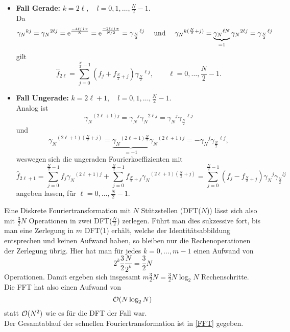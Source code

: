 \begin{itemize}

\item \textbf{Fall Gerade:} $k=2\ell, \quad l=0,1,\ldots,\frac{N}{2}-1$. \\
Da
\begin{displaymath}
{\gamma_N}^{kj} = {\gamma_N}^{2\ell j} = {\operatorname{e}}^{\frac{-4\ell j\operatorname{i}\pi}{N}} = {\operatorname{e}}^{\frac{-2\ell j\operatorname{i}\pi}{N/2}} = {\gamma_\frac{N}{2}}^{\ell j}
\quad\text{ und }\quad
{\gamma_N}^{k(\frac{N}{2}+j)} = \underbrace{{\gamma_N}^{\ell N}}_{=1} {\gamma_N}^{2\ell j} = {\gamma_\frac{N}{2}}^{\ell j}
\end{displaymath}
gilt
\begin{displaymath}
\hat{f}_{2\ell} =  \sum^{\frac{N}{2}-1}_{j=0} (f_j+f_{\frac{N}{2}+j}){\gamma_{\frac{N}{2}}}^{\ell j}, \qquad \ell=0,\ldots,\frac{N}{2}-1.
\end{displaymath}

\item \textbf{Fall Ungerade:} $k=2\ell+1, \quad l=0,1,\ldots,\frac{N}{2}-1$. \\
Analog ist
\begin{displaymath}
{\gamma_N}^{(2\ell+1)j} = {\gamma_N}^{j}{\gamma_N}^{2\ell j} = {\gamma_N}^{j}{\gamma_\frac{N}{2}}^{\ell j}
\end{displaymath}
und
\begin{displaymath}
{\gamma_N}^{(2\ell+1)(\frac{N}{2}+j)} = \underbrace{{\gamma_N}^{(2\ell+1)\frac{N}{2}}}_{=-1} {\gamma_N}^{(2\ell+1)j}   = -{\gamma_N}^{j}{\gamma_\frac{N}{2}}^{\ell j},
\end{displaymath}
weswegen sich die ungeraden Fourierkoeffizienten mit
\begin{displaymath}
\hat{f}_{2\ell+1} =  \sum^{\frac{N}{2}-1}_{j=0} f_j {\gamma_N}^{(2\ell+1)j} + \sum^{\frac{N}{2}-1}_{j=0} f_{\frac{N}{2}+j} {\gamma_N}^{(2\ell+1)(\frac{N}{2}+j)} =  \sum^{\frac{N}{2}-1}_{j=0} (f_j - f_{\frac{N}{2}+j}  ) {\gamma_N}^j {\gamma_{\frac{N}{2}}}^{lj}
\end{displaymath}
angeben lassen, für $\ell=0,\ldots,\frac{N}{2}-1$. 
\end{itemize}

Eine Diskrete Fouriertransformation mit $N$ Stützstellen (DFT($N$)) lässt sich also mit $\frac{3}{2}N$ Operationen in zwei DFT($\frac{N}{2}$) zerlegen. Führt man dies sukzessive fort, bis man eine Zerlegung in $m$ DFT(1) erhält, welche der Identitätsabbildung entsprechen und keinen Aufwand haben, so bleiben nur die Rechenoperationen der Zerlegung übrig. Hier hat man für jedes $k=0,\ldots,m-1$ einen Aufwand von
\begin{displaymath}
2^k \frac{3}{2} \frac{N}{2^k} = \frac{3}{2} N
\end{displaymath}
Operationen. Damit ergeben sich insgesamt $m \frac{3}{2} N = \frac{3}{2} N \log_2 N$ Rechenschritte. Die FFT hat also einen Aufwand von
\begin{displaymath}
\mathcal{O}(N \log_2N)
\end{displaymath}
statt $\mathcal{O}(N^2)$ wie es für die DFT der Fall war. \\
Der Gesamtablauf der schnellen Fouriertransformation ist in \cref{FFT} gegeben.

